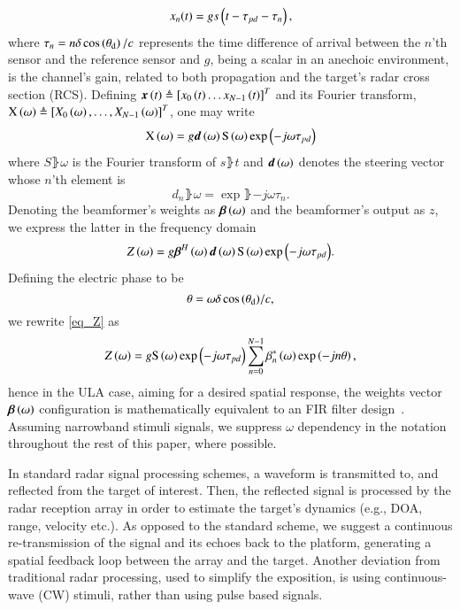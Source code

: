 \begin{equation}
x_{n}(t) = gs\Brack{t-\tau_{pd}-\tau_{n}},
\label{eqn:noFeedbackULA_singleSensor_temporal}
\end{equation}
where $\tau_{n}=n\delta\cos\left({\theta_{\text{d}}}\right)/c$ represents the time difference of arrival between the $n$'th sensor and the reference sensor and $g$, being a scalar in an anechoic environment, is the channel's gain, related to both propagation and the target's radar cross section (RCS).
Defining $\boldsymbol{x}\left({t}\right)\triangleq\left[{x_{0}\left({t}\right)\hdots{}x_{N-1}\left({t}\right)}\right]^{T}$ and its Fourier transform, $\vecnot{\F{x}}\rBrace{\omega}\triangleq\vBrace{X_{0}\rBrace{\omega},\hdots,X_{N-1}\rBrace{\omega}}^{T}$, one may write 
\[
\vecnot{\F{x}}\rBrace{\omega}=g\vecnot{d}\rBrace{\omega}\F{s}\rBrace{\omega}\exp{\rBrace{-j\omega\tau_{pd}}}
\]
where $S\rBrace{\omega}$ is the Fourier transform of $s\rBrace{t}$ and $\boldsymbol{d}\left({\omega}\right)$ denotes the steering vector whose $n$'th element is
\begin{equation}
    \label{eq:d}
    d_{n}\rBrace{\omega} = \exp{\rBrace{-j\omega\tau_{n}}}.
\end{equation}
Denoting the beamformer's weights as $\boldsymbol{\beta}\left({\omega}\right)$ and the beamformer's output as $z$, we express the latter in the frequency domain
\begin{equation}
    \label{eq_Z}
    Z\rBrace{\omega} = g\vecnot{\beta}^{H}\rBrace{\omega}\vecnot{d}\rBrace{\omega}\F{s}\rBrace{\omega}\exp{\rBrace{-j\omega\tau_{pd}}}.
\end{equation}
Defining the electric phase to be
\begin{equation}\label{eq:thetaULA}
\theta=\omega{\delta\cos\Brack{\thetaD}}/{c},
\end{equation}
we rewrite \eqref{eq_Z} as 
\[
Z\rBrace{\omega} = g\F{s}\rBrace{\omega}\exp{\rBrace{-j\omega\tau_{pd}}}\sum_{n=0}^{N-1}\beta^{*}_{n}\rBrace{\omega}\exp\Brack{-jn\theta},
\]
hence in the ULA case, aiming for a desired spatial response, the weights vector $\boldsymbol{\beta}\left({\omega}\right)$ configuration is mathematically equivalent to an FIR filter design~\cite{van1988beamforming,benesty2018}. 
Assuming narrowband stimuli signals, we suppress $\omega$ dependency in the notation throughout the rest of this paper, where possible.
\par In standard radar signal processing schemes, a waveform is transmitted to, and reflected from the target of interest. Then, the reflected signal is processed by the radar reception array in order to estimate the target's dynamics (e.g., DOA, range, velocity etc.). 
As opposed to the standard scheme, we suggest a continuous re-transmission of the signal and its echoes back to the platform, generating a spatial feedback loop between the array and the target.
Another deviation from traditional radar processing, used to simplify the exposition, is using continuous-wave (CW) stimuli, rather than using pulse based signals. 
